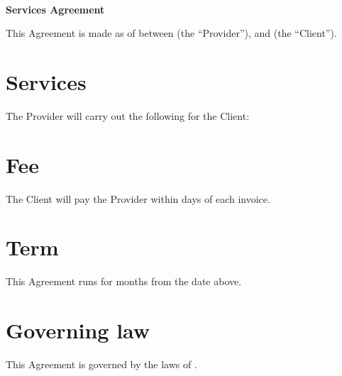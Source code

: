 \documentclass[11pt]{article}
\begin{document}
\begin{center}
{\large {}}\\[0.3em]
{\Large\bfseries Services Agreement}
\end{center}

This Agreement is made as of  between
\textbf{} (the
``Provider''), and \textbf{} (the ``Client'').

\section{Services}
The Provider will carry out the following for the Client:

\section{Fee}
The Client will pay the Provider  within
 days of each invoice.

\section{Term}
This Agreement runs for  months from the date above.

\section{Governing law}
This Agreement is governed by the laws of .

\vspace{3em}
\noindent\signature{provider}\hfill\signature{client}
\end{document}
